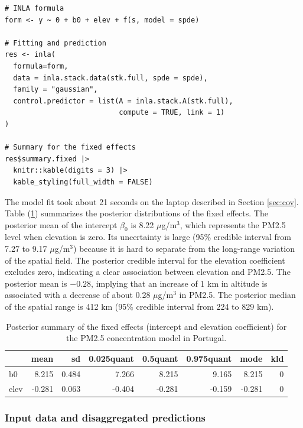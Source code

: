 \begin{verbatim}
# INLA formula
form <- y ~ 0 + b0 + elev + f(s, model = spde)

# Fitting and prediction
res <- inla(
  formula=form,
  data = inla.stack.data(stk.full, spde = spde),
  family = "gaussian",
  control.predictor = list(A = inla.stack.A(stk.full),
                           compute = TRUE, link = 1)
)

# Summary for the fixed effects
res$summary.fixed |>
  knitr::kable(digits = 3) |>
  kable_styling(full_width = FALSE)
\end{verbatim}

The model fit took about 21 seconds on the laptop described in Section \ref{sec:cov}. Table (\ref{tab:fixed-table}) summarizes the posterior distributions of the fixed effects. The posterior mean of the intercept \(\beta_0\) is 8.22 \(\mu\)g/m\(^3\), which represents the PM2.5 level when elevation is zero. Its uncertainty is large (95\% credible interval from 7.27 to 9.17 \(\mu\)g/m\(^3\)) because it is hard to separate from the long-range variation of the spatial field. The posterior credible interval for the elevation coefficient excludes zero, indicating a clear association between elevation and PM2.5. The posterior mean is \(-0.28\), implying that an increase of 1 km in altitude is associated with a decrease of about 0.28 \(\mu\)g/m\(^3\) in PM2.5. The posterior median of the spatial range is 412 km (95\% credible interval from 224 to 829 km).

\begin{table}[H]
\centering
\caption{\label{tab:fixed-table}Posterior summary of the fixed effects (intercept and elevation coefficient) for the PM2.5 concentration model in Portugal.}
\centering
\begin{tabular}[t]{l|r|r|r|r|r|r|r}
\hline
  & mean & sd & 0.025quant & 0.5quant & 0.975quant & mode & kld\\
\hline
b0 & 8.215 & 0.484 & 7.266 & 8.215 & 9.165 & 8.215 & 0\\
\hline
elev & -0.281 & 0.063 & -0.404 & -0.281 & -0.159 & -0.281 & 0\\
\hline
\end{tabular}
\end{table}

\subsubsection{Input data and disaggregated predictions}\label{input-data-and-disaggregated-predictions}

